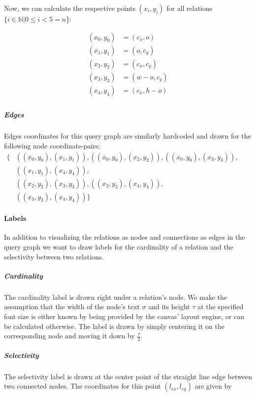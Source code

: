 Now, we can calculate the respective points $(x_i, y_i)$ for all relations $\{i \in \mathbb{N} \vert 0 \leq i < 5 = n$\}:

\begin{equation}
    \begin{aligned}
        (x_0, y_0) &= (c_x,o)\\
        (x_1, y_1) &= (o,c_y)\\
        (x_2, y_2) &= (c_x,c_y)\\
        (x_3, y_3) &= (w-o,c_y)\\
        (x_4, y_4) &= (c_x,h-o)\\
    \end{aligned}
\end{equation}

\subparagraph{Edges}
Edges coordinates for this query graph are similarly hardcoded and drawn for the following node coordinate-pairs:\\

$
\begin{aligned}
    \{& ((x_0,y_0), (x_1, y_1)), ((x_0, y_0), (x_2, y_2)), ((x_0, y_0), (x_3,y_3)),\\
      & ((x_1, y_1),(x_4, y_4)),\\
      & ((x_2, y_2),(x_3, y_3)), ((x_2,y_2),(x_4, y_4)),\\
      & ((x_3, y_3),(x_4, y_4)) \}    
\end{aligned}
$

\paragraph{Labels}
In addition to visualizing the relations as nodes and connections as edges in the query graph we want to draw labels for the cardinality of a relation and the selectivity between two relations.

\subparagraph{Cardinality} The cardinality label is drawn right under a relation's node. We make the assumption that the width of the node's text $\sigma$ and its height $\tau$ at the specified font size is either known by being provided by the canvas' layout engine, or can be calculated otherwise. The label is drawn by simply centering it on the corresponding node and moving it down by $\frac{\tau}{2}$.

\subparagraph{Selectivity}
The selectivity label is drawn at the center point of the straight line edge between two connected nodes. The coordinates for this point $(l_{cx}, l_{cy})$ are given by

